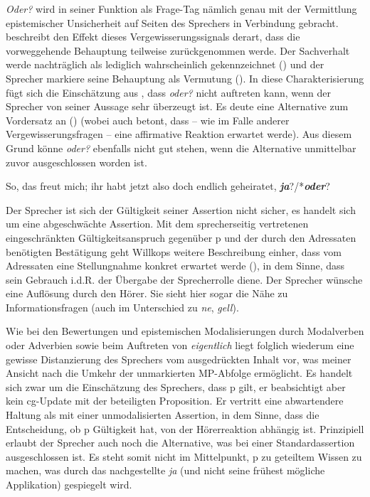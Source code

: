 \textit{Oder?} wird in seiner Funktion als Frage-Tag nämlich genau mit der Ver\-mittlung epistemischer Unsicherheit auf Seiten des Sprechers in Verbindung gebracht. \citet[273]{Willkop1988} beschreibt den Effekt dieses Vergewisserungssignals derart, dass die vorweggehende Behauptung teilweise zurückgenommen werde. Der Sachverhalt werde \glqq nachträglich als lediglich wahrscheinlich gekennzeichnet\grqq{} (\citeyear[271]{Willkop1988}) und der Sprecher markiere seine Behauptung als Vermutung (\citeyear[272]{Willkop1988}). In diese Charakterisierung fügt sich die Einschätzung aus \citet[131]{Bublitz1978}, dass \textit{oder?} nicht auftreten kann, wenn der Sprecher von seiner Aussage sehr überzeugt ist. Es deute eine \glqq Alternative zum Vordersatz an\grqq{} (\citeyear[126]{Bublitz1978}) (wobei \citealt[276]{Willkop1988} auch betont, dass – wie im Falle anderer Vergewisserungsfragen – eine affirmative Reaktion erwartet werde). Aus diesem Grund könne \textit{oder?} ebenfalls nicht gut stehen, wenn die Alternative unmittelbar zuvor ausgeschlossen worden ist.

\begin{exe}
	\ex\label{494} 
	So, das freut mich; ihr habt jetzt also doch endlich geheiratet, \textit{\textbf{ja}}?/*\textit{\textbf{oder}}?
	\newline
	\hbox{}\hfill\hbox {\citet[127]{Bublitz1978}}			
\end{exe}
Der Sprecher ist sich der Gültigkeit seiner Assertion nicht sicher, es handelt sich um eine  abgeschwächte Assertion. Mit dem sprecherseitig vertretenen einge\-schränkten Gültigkeitsanspruch gegenüber p und der durch den Adressaten benö\-tigten Bestätigung geht Willkops weitere Beschreibung einher, dass vom Adressaten eine Stellungnahme konkret erwartet werde (\citeyear[272]{Willkop1988}), in dem Sinne, dass sein Gebrauch i.d.R. der Übergabe der Sprecherrolle diene. Der Sprecher wünsche eine Auflösung durch den Hörer. Sie sieht hier sogar die Nähe zu Informationsfragen (auch im Unterschied zu \textit{ne}, \textit{gell}).

Wie bei den Bewertungen und epistemischen Modalisierungen durch Modalverben oder Adverbien sowie beim Auftreten von \textit{eigentlich} liegt folglich wiederum eine gewisse Distanzierung des Sprechers vom ausgedrückten Inhalt vor, was meiner Ansicht nach die Umkehr der unmarkierten MP-Abfolge ermöglicht. Es handelt sich zwar um die Einschätzung des Sprechers, dass p gilt, er beabsichtigt aber kein cg-Update mit der beteiligten Proposition. Er vertritt eine abwartendere Haltung als mit einer unmodalisierten Assertion, in dem Sinne, dass die Entscheidung, ob p Gültigkeit hat, von der Hörerreaktion abhängig ist. Prinzipiell erlaubt der Sprecher auch noch die Alternative, was bei einer Standardassertion ausgeschlossen ist. Es steht somit nicht im Mittelpunkt, p zu geteiltem Wissen zu machen, was durch das nachgestellte \textit{ja} (und nicht seine frühest mögliche Ap\-plikation) gespiegelt wird.


